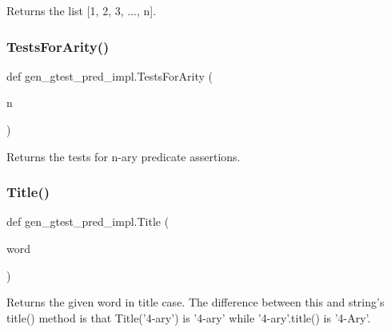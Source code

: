 \begin{DoxyVerb}Returns the list [1, 2, 3, ..., n].\end{DoxyVerb}
 \mbox{\label{namespacegen__gtest__pred__impl_ab0da913fa15e5695d5bb2dd1de5dec57}} 
\subsubsection{\texorpdfstring{Tests\+For\+Arity()}{TestsForArity()}}
{\footnotesize\ttfamily def gen\+\_\+gtest\+\_\+pred\+\_\+impl.\+Tests\+For\+Arity (\begin{DoxyParamCaption}\item[{}]{n }\end{DoxyParamCaption})}

\begin{DoxyVerb}Returns the tests for n-ary predicate assertions.\end{DoxyVerb}
 \mbox{\label{namespacegen__gtest__pred__impl_ae49dd9bd9152dbcb3ca7994ce04c37ba}} 
\subsubsection{\texorpdfstring{Title()}{Title()}}
{\footnotesize\ttfamily def gen\+\_\+gtest\+\_\+pred\+\_\+impl.\+Title (\begin{DoxyParamCaption}\item[{}]{word }\end{DoxyParamCaption})}

\begin{DoxyVerb}Returns the given word in title case.  The difference between
this and string's title() method is that Title('4-ary') is '4-ary'
while '4-ary'.title() is '4-Ary'.\end{DoxyVerb}
 \mbox{\label{namespacegen__gtest__pred__impl_a57b922f50d0807896496dcd883c1f098}} 
